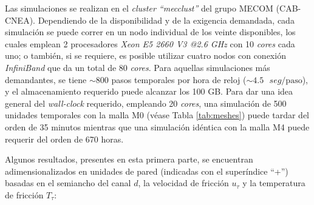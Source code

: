Las simulaciones se realizan en el \textit{cluster ``mecclust''} del grupo MECOM (CAB-CNEA). Dependiendo de la disponibilidad y de la exigencia demandada, cada simulación se puede \linebreak correr en un nodo individual de los veinte disponibles, los cuales emplean 2 procesadores \textit{Xeon E5 2660 V3 @2.6 GHz} con 10 \textit{cores} cada uno; o también, si se requiere, es posible utilizar cuatro nodos con conexión \textit{InfiniBand} que da un total de 80 \textit{cores}. Para aquellas simulaciones más demandantes, se tiene $\sim 800$ pasos temporales por hora de reloj ($\sim 4\text{.}5 \text{ } seg/\text{paso}$), y el almacenamiento requerido puede alcanzar los 100 GB. Para dar una idea general del \textit{wall-clock} requerido, empleando 20 \textit{cores}, una simulación de 500 unidades temporales con la malla M0 (véase Tabla \ref{tab:meshes}) puede tardar del orden de 35 minutos mientras que una simulación idéntica con la malla M4 puede requerir del orden de 670 horas.       


\begin{table}[H]
\centering
{}
\caption{Distintas resoluciones espaciales y temporales utilizadas \textcolor{black}{(adimensionales)} en las simulaciones de validación. Debido a que la discretización en la dirección $Y$ es no uniforme, se reporta tanto el mínimo como el máximo $\Delta y$ asociado.}
\label{tab:meshes}
\end{table}

Algunos resultados, presentes en esta primera parte, se encuentran adimensionalizados en unidades de pared (indicadas con el superíndice ``+'') basadas en el semiancho del canal $d$, la velocidad de fricción $u_{\tau}$ y la temperatura de fricción $T_{\tau}$:

